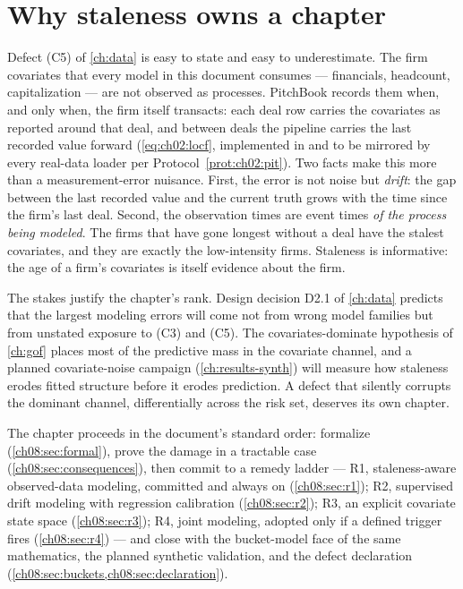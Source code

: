 
\section{Why staleness owns a chapter}\label{ch08:sec:problem}

Defect (C5) of \cref{ch:data} is easy to state and easy to underestimate.
The firm covariates that every model in this document consumes ---
financials, headcount, capitalization --- are not observed as processes.
PitchBook records them when, and only when, the firm itself transacts:
each deal row carries the covariates as reported around that deal, and
between deals the pipeline carries the last recorded value forward
(\cref{eq:ch02:locf}, implemented in  and to be
mirrored by every real-data loader per Protocol~\ref{prot:ch02:pit}). Two facts
make this more than a measurement-error nuisance. First, the error is not
noise but \emph{drift}: the gap between the last recorded value and the
current truth grows with the time since the firm's last deal. Second, the
observation times
are event times \emph{of the process being modeled}. The firms that have
gone longest without a deal have the stalest covariates, and they are
exactly the low-intensity firms. Staleness is informative: the age of a
firm's covariates is itself evidence about the firm.

The stakes justify the chapter's rank. Design decision D2.1 of
\cref{ch:data} predicts that the largest modeling errors will come not
from wrong model families but from unstated exposure to (C3) and (C5).
The covariates-dominate hypothesis of \cref{ch:gof} places most of the
predictive mass in the covariate channel, and a planned covariate-noise
campaign (\cref{ch:results-synth}) will measure how staleness erodes
fitted structure before it erodes prediction. A defect that silently
corrupts the dominant channel, differentially across the risk set,
deserves its own chapter.

The chapter proceeds in the document's standard order: formalize
(\cref{ch08:sec:formal}), prove the damage in a tractable case
(\cref{ch08:sec:consequences}), then commit to a remedy ladder --- R1,
staleness-aware observed-data modeling, committed and always on
(\cref{ch08:sec:r1}); R2, supervised drift modeling with regression
calibration (\cref{ch08:sec:r2}); R3, an explicit covariate state space
(\cref{ch08:sec:r3}); R4, joint modeling, adopted only if a defined
trigger fires (\cref{ch08:sec:r4}) --- and close with the bucket-model
face of the same mathematics, the planned synthetic validation, and the
defect declaration (\cref{ch08:sec:buckets,ch08:sec:declaration}).

